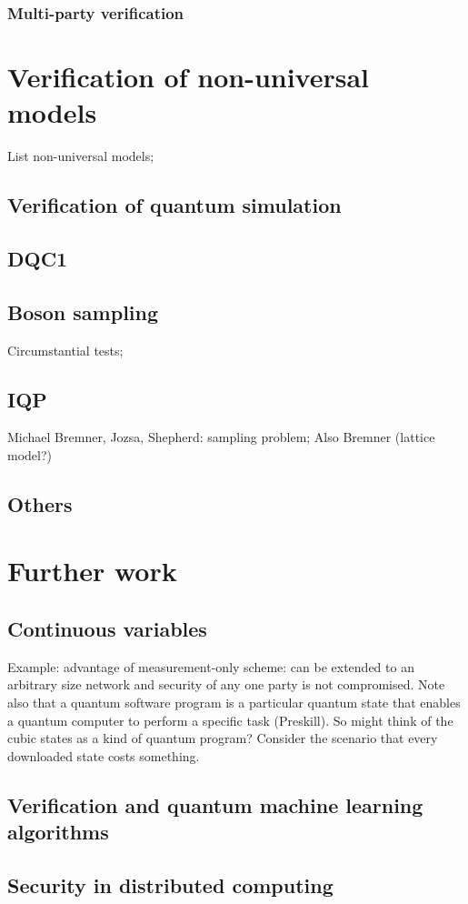 \documentclass[pra,onecolumn,preprintnumbers,superscriptaddress]{revtex4}
\begin{document}
\subsubsection{Multi-party verification}
\section{Verification of non-universal models}
List non-universal models; 
\subsection{Verification of quantum simulation}
\subsection{DQC1}
\subsection{Boson sampling}
Circumstantial tests; 
\subsection{IQP}
Michael Bremner, Jozsa, Shepherd: sampling problem; Also Bremner (lattice model?) 
\subsection{Others}
\section{Further work}
\subsection{Continuous variables}
Example: advantage of measurement-only scheme: can be extended to an arbitrary size network and security of any one party is not compromised. Note also that a quantum software program is a particular quantum state that enables a quantum computer to perform a specific task (Preskill). So might think of the cubic states as a kind of quantum program? Consider the scenario that every downloaded state costs something. 
\subsection{Verification and quantum machine learning algorithms}
\subsection{Security in distributed computing}




%
\end{document}
